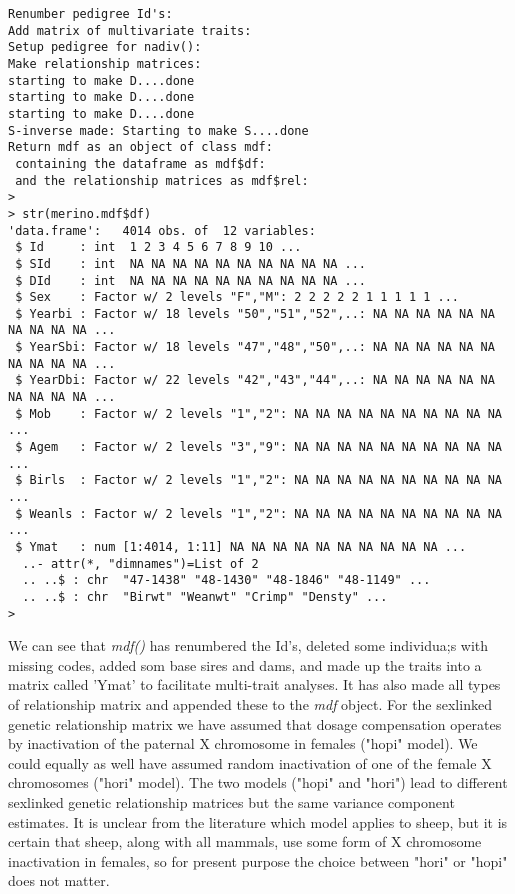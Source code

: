 \documentclass[titlepage]{article}  %
\begin{document}
\begin{verbatim}
Renumber pedigree Id's:
Add matrix of multivariate traits:
Setup pedigree for nadiv():
Make relationship matrices:
starting to make D....done 
starting to make D....done 
starting to make D....done 
S-inverse made: Starting to make S....done 
Return mdf as an object of class mdf:
 containing the dataframe as mdf$df:
 and the relationship matrices as mdf$rel:
> 
> str(merino.mdf$df)
'data.frame':	4014 obs. of  12 variables:
 $ Id     : int  1 2 3 4 5 6 7 8 9 10 ...
 $ SId    : int  NA NA NA NA NA NA NA NA NA NA ...
 $ DId    : int  NA NA NA NA NA NA NA NA NA NA ...
 $ Sex    : Factor w/ 2 levels "F","M": 2 2 2 2 2 1 1 1 1 1 ...
 $ Yearbi : Factor w/ 18 levels "50","51","52",..: NA NA NA NA NA NA NA NA NA NA ...
 $ YearSbi: Factor w/ 18 levels "47","48","50",..: NA NA NA NA NA NA NA NA NA NA ...
 $ YearDbi: Factor w/ 22 levels "42","43","44",..: NA NA NA NA NA NA NA NA NA NA ...
 $ Mob    : Factor w/ 2 levels "1","2": NA NA NA NA NA NA NA NA NA NA ...
 $ Agem   : Factor w/ 2 levels "3","9": NA NA NA NA NA NA NA NA NA NA ...
 $ Birls  : Factor w/ 2 levels "1","2": NA NA NA NA NA NA NA NA NA NA ...
 $ Weanls : Factor w/ 2 levels "1","2": NA NA NA NA NA NA NA NA NA NA ...
 $ Ymat   : num [1:4014, 1:11] NA NA NA NA NA NA NA NA NA NA ...
  ..- attr(*, "dimnames")=List of 2
  .. ..$ : chr  "47-1438" "48-1430" "48-1846" "48-1149" ...
  .. ..$ : chr  "Birwt" "Weanwt" "Crimp" "Densty" ...
> 
\end{verbatim}
We can see that {\em mdf()} has renumbered the Id's, deleted some individua;s with missing codes, added som base sires and dams, and made up the traits into a matrix called 'Ymat' to facilitate multi-trait analyses. It has also made all types of relationship matrix and appended these to the {\em mdf} object. For the sexlinked genetic relationship matrix we have assumed that dosage compensation operates by inactivation of the paternal X chromosome in females ("hopi" model).  We could equally as well have assumed random inactivation of one of the female X chromosomes ("hori" model). The two models ("hopi" and "hori") lead to different sexlinked genetic relationship matrices but the same variance component estimates.  It is unclear from the literature which model applies to sheep, but it is certain that sheep, along with all mammals, use some form of X chromosome inactivation in females, so for present purpose the choice between "hori" or "hopi" does not matter.
\end{document}

